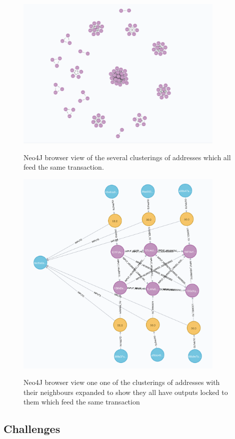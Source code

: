 \begin{figure}[h!]
  \centering
  \includegraphics[width = 10cm]{./figures/many-clusters-heuristic-1}\\[0.5cm] 
  \caption{Neo4J browser view of the several clusterings of addresses which all feed the same transaction.}
  \label{fig:neo4j-many-heuristic-1-clusters}
\end{figure}

\begin{figure}[h!]
  \centering
  \includegraphics[width = 10cm]{./figures/input-one-tx-heuristic-1}\\[0.5cm] 
  \caption{Neo4J browser view one one of the clusterings of addresses with their neighbours expanded to show they all have outputs locked to them which feed the same transaction}
  \label{fig:neo4j-1-tx-heuristic-1-cluster}
\end{figure}


\subsection{Challenges}

